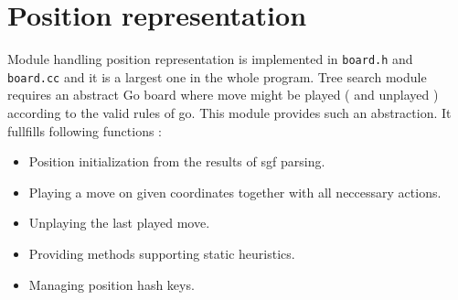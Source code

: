\section{Position representation}\label{page_6}
Module handling position representation is implemented in {\tt board.h} and {\tt board.cc} and it is a largest one in the whole program. Tree search module requires an abstract Go board where move might be played ( and unplayed ) according to the valid rules of go. This module provides such an abstraction. It fullfills following functions :\begin{itemize}
\item Position initialization from the results of sgf parsing.\item Playing a move on given coordinates together with all neccessary actions.\item Unplaying the last played move.\item Providing methods supporting static heuristics.\item Managing position hash keys.\end{itemize}


